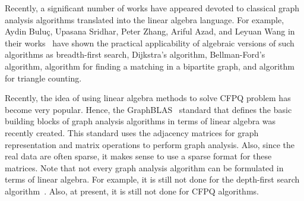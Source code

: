 {\progress}
Recently, a significant number of works have appeared devoted to classical graph analysis algorithms translated into the linear algebra language. For example, Aydin Bulu\c{c}, Upasana Sridhar, Peter Zhang, Ariful Azad, and Leyuan Wang in their works~\cite{bulucc2011parallel,sridhar2019delta,zhang2016gbtl,azad2015parallel,wang2016comparative} have shown the practical applicability of algebraic versions of such algorithms as breadth-first search, Dijkstra's algorithm, Bellman-Ford's algorithm, algorithm for finding a matching in a bipartite graph, and algorithm for triangle counting.

Recently, the idea of using linear algebra methods to solve CFPQ problem has become very popular. Hence, the GraphBLAS~\cite{graphblas} standard that defines the basic building blocks of graph analysis algorithms in terms of linear algebra was recently created. This standard uses the adjacency matrices for graph representation and matrix operations to perform graph analysis. Also, since the real data are often sparse, it makes sense to use a sparse format for these matrices. Note that not every graph analysis algorithm can be formulated in terms of linear algebra. For example, it is still not done for the depth-first search algorithm~\cite{spampinato2019linear}. Also, at present, it is still not done for CFPQ algorithms.

